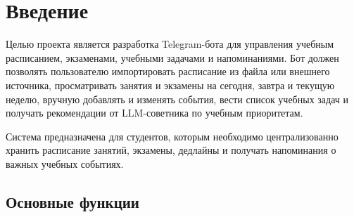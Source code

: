 \documentclass[10pt,a4paper,final]{article} %
\begin{document}
\tableofcontents

\newpage
\section* {Введение}



Целью проекта является разработка Telegram-бота для управления учебным расписанием, экзаменами, учебными задачами и напоминаниями. Бот должен позволять пользователю импортировать расписание из файла или внешнего источника, просматривать занятия и экзамены на сегодня, завтра и текущую неделю, вручную добавлять и изменять события, вести список учебных задач и получать рекомендации от LLM-советника по учебным приоритетам.

Система предназначена для студентов, которым необходимо централизованно хранить расписание занятий, экзамены, дедлайны и получать напоминания о важных учебных событиях.

\subsection{Основные функции}
\end{document}

